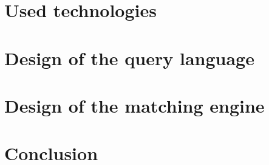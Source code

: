 \section{Used technologies}
\section{Design of the query language}
\section{Design of the matching engine}
\section{Conclusion}